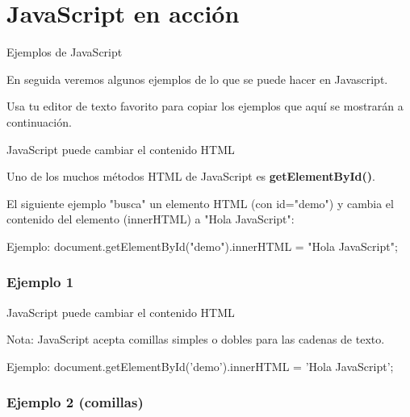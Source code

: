 \section{JavaScript en acción}

\begin{frame}[c]{Ejemplos de JavaScript}

  En seguida veremos algunos ejemplos de lo que se puede hacer en
  Javascript.

  \vspace{\baselineskip}
  Usa tu editor de texto favorito para copiar los ejemplos que aquí se
  mostrarán a continuación.
\end{frame}

\begin{frame}[c]{JavaScript puede cambiar el contenido HTML}

  Uno de los muchos métodos HTML de JavaScript es \textbf{getElementById()}.

  El siguiente ejemplo "busca" un elemento HTML (con id="demo") y cambia el
  contenido del elemento (innerHTML) a "Hola JavaScript":

  \vspace{\baselineskip}
  \begin{exampleblock}{Ejemplo:}
     document.getElementById("demo").innerHTML = "Hola JavaScript";
  \end{exampleblock}

\end{frame}

\begin{frame}[fragile]
  \frametitle{Ejemplo 1}
  
\end{frame}

\begin{frame}[c]{JavaScript puede cambiar el contenido HTML}

  \vspace{\baselineskip}
  \begin{alertblock}{Nota:}
    JavaScript acepta comillas simples o dobles para las cadenas de texto.
  \end{alertblock}

  \vspace{\baselineskip}
  \begin{exampleblock}{Ejemplo:}
     document.getElementById('demo').innerHTML = 'Hola JavaScript';
  \end{exampleblock}
\end{frame}

\begin{frame}[fragile]
  \frametitle{Ejemplo 2 (comillas)}
  
\end{frame}

